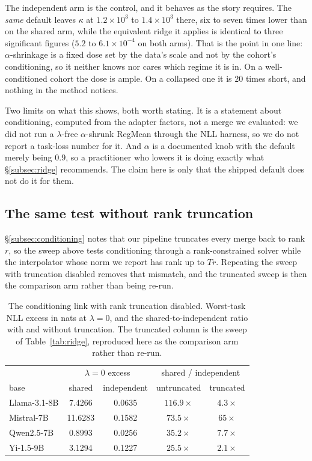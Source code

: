 The independent arm is the control, and it behaves as the story requires. The
\emph{same} default leaves $\kappa$ at $1.2\times10^{3}$ to $1.4\times10^{3}$
there, six to seven times lower than on the shared arm, while the equivalent
ridge it applies is identical to three significant figures
($5.2$ to $6.1\times10^{-4}$ on both arms). That is the point in one line:
$\alpha$-shrinkage is a fixed dose set by the data's scale and not by the
cohort's conditioning, so it neither knows nor cares which regime it is in.
On a well-conditioned cohort the dose is ample. On a collapsed one it is
$20$ times short, and nothing in the method notices.

Two limits on what this shows, both worth stating. It is a statement about
conditioning, computed from the adapter factors, not a merge we evaluated: we
did not run a $\lambda$-free $\alpha$-shrunk RegMean through the NLL harness,
so we do not report a task-loss number for it. And $\alpha$ is a documented
knob with the default merely being $0.9$, so a practitioner who lowers it is
doing exactly what \S\ref{subsec:ridge} recommends. The claim here is only
that the shipped default does not do it for them.

\subsection{The same test without rank truncation}
\label{subsec:untruncated}

\S\ref{subsec:conditioning} notes that our pipeline truncates every merge
back to rank $r$, so the sweep above tests conditioning through a
rank-constrained solver while the interpolator whose norm we report has
rank up to $Tr$. Repeating the sweep with truncation disabled removes that
mismatch, and the truncated sweep is then the comparison arm rather than
being re-run.

\begin{table}[htb]
\centering
\small
\caption{The conditioning link with rank truncation disabled. Worst-task NLL
excess in nats at $\lambda = 0$, and the shared-to-independent ratio with and
without truncation. The truncated column is the sweep of
Table~\ref{tab:ridge}, reproduced here as the comparison arm rather than
re-run.}
\label{tab:untruncated}
\begin{tabular}{lcccc}
\toprule
 & \multicolumn{2}{c}{$\lambda = 0$ excess} & \multicolumn{2}{c}{shared / independent} \\
base & shared & independent & untruncated & truncated \\
\midrule
Llama-3.1-8B & 7.4266  & 0.0635 & $116.9\times$ & $4.3\times$ \\
Mistral-7B   & 11.6283 & 0.1582 & $73.5\times$  & $65\times$ \\
Qwen2.5-7B   & 0.8993  & 0.0256 & $35.2\times$  & $7.7\times$ \\
Yi-1.5-9B    & 3.1294  & 0.1227 & $25.5\times$  & $2.1\times$ \\
\bottomrule
\end{tabular}
\end{table}

